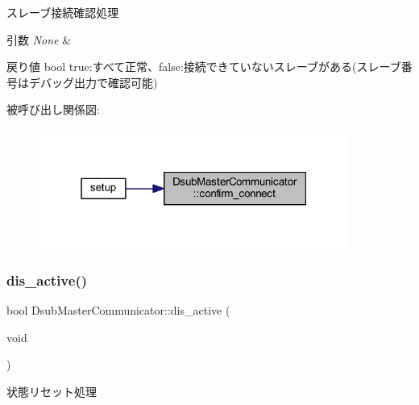スレーブ接続確認処理 


\begin{DoxyParams}{引数}
{\em None} & \\
\hline
\end{DoxyParams}
\begin{DoxyReturn}{戻り値}
bool true\+:すべて正常、false\+:接続できていないスレーブがある(スレーブ番号はデバッグ出力で確認可能) 
\end{DoxyReturn}
被呼び出し関係図\+:\nopagebreak
\begin{figure}[H]
\begin{center}
\leavevmode
\includegraphics[width=289pt]{class_dsub_master_communicator_acb3acb522c4ff0099044fe9451008864_icgraph}
\end{center}
\end{figure}
\mbox{\label{class_dsub_master_communicator_ac0a9298c691adbdf844f85d680d7e554}} 
\subsubsection{\texorpdfstring{dis\_active()}{dis\_active()}}
{\footnotesize\ttfamily bool Dsub\+Master\+Communicator\+::dis\+\_\+active (\begin{DoxyParamCaption}\item[{void}]{ }\end{DoxyParamCaption})}



状態リセット処理 



